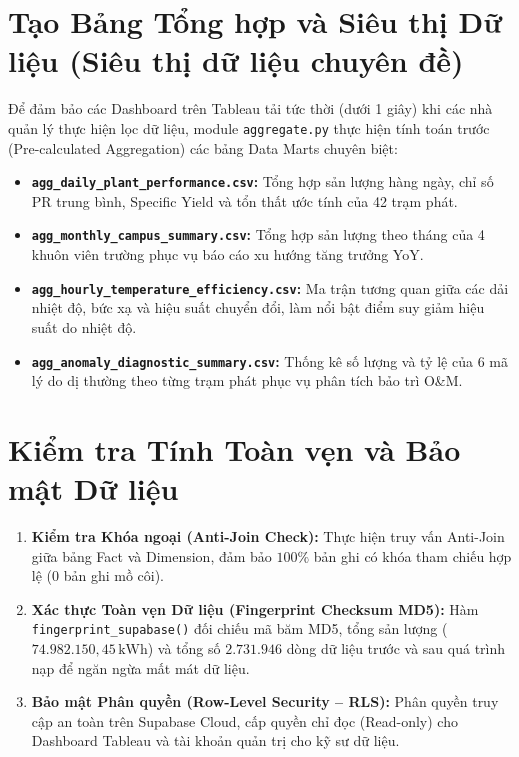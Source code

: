 \section{Tạo Bảng Tổng hợp và Siêu thị Dữ liệu (Siêu thị dữ liệu chuyên đề)}
\label{sec:data_marts}

Để đảm bảo các Dashboard trên Tableau tải tức thời (dưới 1 giây) khi các nhà quản lý thực hiện lọc dữ liệu, module \texttt{aggregate.py} thực hiện tính toán trước (Pre-calculated Aggregation) các bảng Data Marts chuyên biệt:

\begin{itemize}[noitemsep]
    \item \textbf{\texttt{agg\_daily\_plant\_performance.csv}:} Tổng hợp sản lượng hàng ngày, chỉ số PR trung bình, Specific Yield và tổn thất ước tính của 42 trạm phát.
    \item \textbf{\texttt{agg\_monthly\_campus\_summary.csv}:} Tổng hợp sản lượng theo tháng của 4 khuôn viên trường phục vụ báo cáo xu hướng tăng trưởng YoY.
    \item \textbf{\texttt{agg\_hourly\_temperature\_efficiency.csv}:} Ma trận tương quan giữa các dải nhiệt độ, bức xạ và hiệu suất chuyển đổi, làm nổi bật điểm suy giảm hiệu suất do nhiệt độ.
    \item \textbf{\texttt{agg\_anomaly\_diagnostic\_summary.csv}:} Thống kê số lượng và tỷ lệ của 6 mã lý do dị thường theo từng trạm phát phục vụ phân tích bảo trì O\&M.
\end{itemize}

\section{Kiểm tra Tính Toàn vẹn và Bảo mật Dữ liệu}
\label{sec:integrity_security}

\begin{enumerate}[noitemsep]
    \item \textbf{Kiểm tra Khóa ngoại (Anti-Join Check):} Thực hiện truy vấn Anti-Join giữa bảng Fact và Dimension, đảm bảo $100\%$ bản ghi có khóa tham chiếu hợp lệ (0 bản ghi mồ côi).
    \item \textbf{Xác thực Toàn vẹn Dữ liệu (Fingerprint Checksum MD5):} Hàm \texttt{fingerprint\_supabase()} đối chiếu mã băm MD5, tổng sản lượng ($74.982.150{,}45\,\text{kWh}$) và tổng số $2.731.946$ dòng dữ liệu trước và sau quá trình nạp để ngăn ngừa mất mát dữ liệu.
    \item \textbf{Bảo mật Phân quyền (Row-Level Security -- RLS):} Phân quyền truy cập an toàn trên Supabase Cloud, cấp quyền chỉ đọc (Read-only) cho Dashboard Tableau và tài khoản quản trị cho kỹ sư dữ liệu.
\end{enumerate}